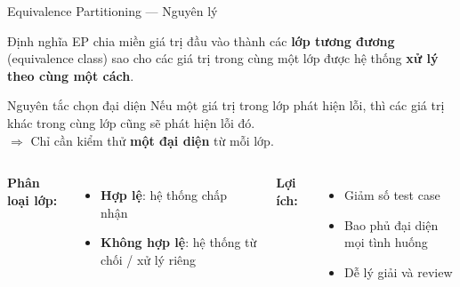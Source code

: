\documentclass[aspectratio=169,12pt]{beamer}
\begin{document}
\begin{frame}[shrink=10]{Equivalence Partitioning --- Nguyên lý}
  \begin{block}{Định nghĩa}
    EP chia miền giá trị đầu vào thành các \textbf{lớp tương đương}
    (equivalence class) sao cho các giá trị trong cùng một lớp
    được hệ thống \textbf{xử lý theo cùng một cách}.
  \end{block}

  \vspace{0.2em}
  \begin{block}{Nguyên tắc chọn đại diện}
    Nếu một giá trị trong lớp phát hiện lỗi, thì các giá trị khác
    trong cùng lớp cũng sẽ phát hiện lỗi đó.\\[0.1em]
    $\Rightarrow$ Chỉ cần kiểm thử \textbf{một đại diện} từ mỗi lớp.
  \end{block}

  \vspace{0.15em}
  \small
  \begin{columns}[T,totalwidth=\textwidth]
    \textbf{Phân loại lớp:}
    \begin{itemize}
      \item \textbf{Hợp lệ}: hệ thống chấp nhận
      \item \textbf{Không hợp lệ}: hệ thống từ chối / xử lý riêng
    \end{itemize}

    \textbf{Lợi ích:}
    \begin{itemize}
      \item Giảm số test case
      \item Bao phủ đại diện mọi tình huống
      \item Dễ lý giải và review
    \end{itemize}
  \end{columns}
\end{frame}
\end{document}
